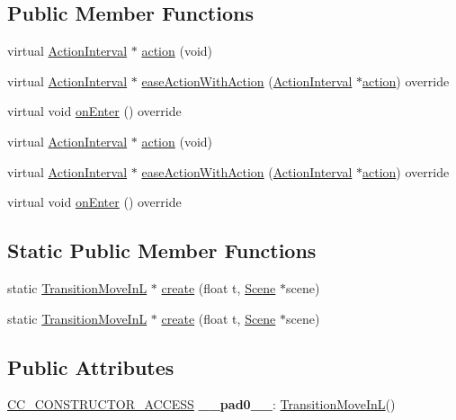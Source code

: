 \subsection*{Public Member Functions}
\begin{DoxyCompactItemize}
\item 
virtual \hyperlink{classActionInterval}{Action\+Interval} $\ast$ \hyperlink{classTransitionMoveInL_ade316ecf0541babff01dc6a69226171d}{action} (void)
\item 
virtual \hyperlink{classActionInterval}{Action\+Interval} $\ast$ \hyperlink{classTransitionMoveInL_ab9e3308035155049f79a074ade4de8a1}{ease\+Action\+With\+Action} (\hyperlink{classActionInterval}{Action\+Interval} $\ast$\hyperlink{classTransitionMoveInL_ade316ecf0541babff01dc6a69226171d}{action}) override
\item 
virtual void \hyperlink{classTransitionMoveInL_a790048ed6247fef9cefd40f39b53d3d5}{on\+Enter} () override
\item 
virtual \hyperlink{classActionInterval}{Action\+Interval} $\ast$ \hyperlink{classTransitionMoveInL_a2df9a406efaaa265c6996494ddfad304}{action} (void)
\item 
virtual \hyperlink{classActionInterval}{Action\+Interval} $\ast$ \hyperlink{classTransitionMoveInL_a298883652b158cc690f487c011b75255}{ease\+Action\+With\+Action} (\hyperlink{classActionInterval}{Action\+Interval} $\ast$\hyperlink{classTransitionMoveInL_ade316ecf0541babff01dc6a69226171d}{action}) override
\item 
virtual void \hyperlink{classTransitionMoveInL_a4cf29668bcdd420cebb6135f80dd81f8}{on\+Enter} () override
\end{DoxyCompactItemize}
\subsection*{Static Public Member Functions}
\begin{DoxyCompactItemize}
\item 
static \hyperlink{classTransitionMoveInL}{Transition\+Move\+InL} $\ast$ \hyperlink{classTransitionMoveInL_a5e0d08e3fc7a5df21855ed93b112f68f}{create} (float t, \hyperlink{classScene}{Scene} $\ast$scene)
\item 
static \hyperlink{classTransitionMoveInL}{Transition\+Move\+InL} $\ast$ \hyperlink{classTransitionMoveInL_a8d95ce8733235baf8396842768db0cba}{create} (float t, \hyperlink{classScene}{Scene} $\ast$scene)
\end{DoxyCompactItemize}
\subsection*{Public Attributes}
\begin{DoxyCompactItemize}
\item 
\mbox{\label{classTransitionMoveInL_a26943834a05bcfd2d7e9c4082908a602}} 
\hyperlink{_2cocos2d_2cocos_2base_2ccConfig_8h_a25ef1314f97c35a2ed3d029b0ead6da0}{C\+C\+\_\+\+C\+O\+N\+S\+T\+R\+U\+C\+T\+O\+R\+\_\+\+A\+C\+C\+E\+SS} {\bfseries \+\_\+\+\_\+pad0\+\_\+\+\_\+}\+: \hyperlink{classTransitionMoveInL}{Transition\+Move\+InL}()
\end{DoxyCompactItemize}
